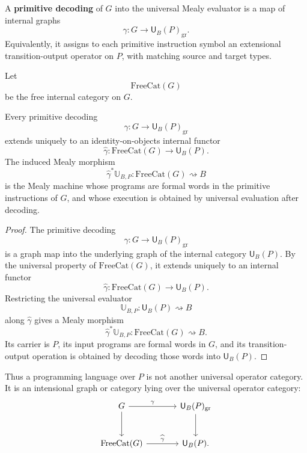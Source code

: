 \begin{definition}
A \textbf{primitive decoding} of \(G\) into the universal Mealy evaluator is a map of internal
graphs
\[
        \gamma:G\longrightarrow \mathsf U_B(P)_{\mathrm{gr}}.
\]
Equivalently, it assigns to each primitive instruction symbol an extensional transition-output
operator on \(P\), with matching source and target types.
\end{definition}

Let
\[
        \mathrm{FreeCat}(G)
\]
be the free internal category on \(G\).

\begin{theorem}
\label{thm:free-intensional-extension}
Every primitive decoding
\[
        \gamma:G\longrightarrow \mathsf U_B(P)_{\mathrm{gr}}
\]
extends uniquely to an identity-on-objects internal functor
\[
        \widehat{\gamma}:
        \mathrm{FreeCat}(G)
        \longrightarrow
        \mathsf U_B(P).
\]
The induced Mealy morphism
\[
        \widehat{\gamma}^{\ast}\mathbb U_{B,P}
        :
        \mathrm{FreeCat}(G)\rightsquigarrow B
\]
is the Mealy machine whose programs are formal words in the primitive instructions of \(G\), and
whose execution is obtained by universal evaluation after decoding.
\end{theorem}

\begin{proof}
The primitive decoding
\[
        \gamma:G\to\mathsf U_B(P)_{\mathrm{gr}}
\]
is a graph map into the underlying graph of the internal category \(\mathsf U_B(P)\).  By the
universal property of \(\mathrm{FreeCat}(G)\), it extends uniquely to an internal functor
\[
        \widehat{\gamma}:\mathrm{FreeCat}(G)\to\mathsf U_B(P).
\]
Restricting the universal evaluator
\[
        \mathbb U_{B,P}:\mathsf U_B(P)\rightsquigarrow B
\]
along \(\widehat{\gamma}\) gives a Mealy morphism
\[
        \widehat{\gamma}^{\ast}\mathbb U_{B,P}
        :
        \mathrm{FreeCat}(G)\rightsquigarrow B.
\]
Its carrier is \(P\), its input programs are formal words in \(G\), and its transition-output
operation is obtained by decoding those words into \(\mathsf U_B(P)\).
\end{proof}

Thus a programming language over \(P\) is not another universal operator category.  It is an
intensional graph or category lying over the universal operator category:
\[
\begin{tikzcd}[column sep=large,row sep=large]
G
\ar[r,"\gamma"]
\ar[d]
&
\mathsf U_B(P)_{\mathrm{gr}}
\ar[d]
\\
\mathrm{FreeCat}(G)
\ar[r,"\widehat{\gamma}"]
&
\mathsf U_B(P).
\end{tikzcd}
\]

